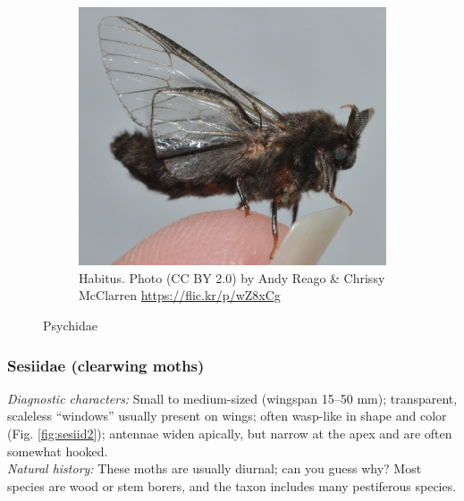 \documentclass[letterpaper, 11pt]{article}
\begin{document}
\begin{figure}[ht!]
\begin{subfigure}[ht!]{0.35\textwidth}
        \includegraphics[width=\textwidth]{PsychidHabitus}
        \caption{Habitus. Photo (CC BY 2.0) by Andy Reago \& Chrissy McClarren \url{https://flic.kr/p/wZ8xCg}}
        \label{fig:psychid3}
    \end{subfigure}
    \caption{Psychidae}\label{fig:psychids}
\end{figure}

\subsubsection{Sesiidae (clearwing moths)}
\noindent{}\textit{Diagnostic characters:} Small to medium-sized (wingspan 15--50 mm); transparent, scaleless ``windows'' usually present on wings; often wasp-like in shape and color (Fig. \ref{fig:sesiid2}); antennae widen apically, but narrow at the apex and are often somewhat hooked.\\

\noindent{}\textit{Natural history:} These moths are usually diurnal; can you guess why? Most species are wood or stem borers, and the taxon includes many pestiferous species.
\end{document}
